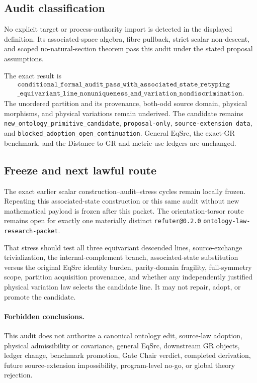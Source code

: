 \subsection{Audit classification}

No explicit target or process-authority import is detected in the displayed
definition.  Its associated-space algebra, fibre pullback, strict scalar
non-descent, and scoped no-natural-section theorem pass this audit under the
stated proposal assumptions.

The exact result is
\[
\begin{split}
\texttt{conditional\_formal\_audit\_pass\_with\_associated\_state\_retyping}\\
\texttt{\_equivariant\_line\_nonuniqueness\_and\_variation\_nondiscrimination}.
\end{split}
\]
The unordered partition and its provenance, both-odd source domain, physical
morphisms, and physical variations remain underived.  The candidate remains
\texttt{new\_ontology\_primitive\_candidate}, \texttt{proposal-only},
\texttt{source-extension data}, and
\texttt{blocked\_adoption\_open\_continuation}.  General
\(\mathrm{EqSrc}\), the exact-GR benchmark, and the Distance-to-GR and
metric-use ledgers are unchanged.

\subsection{Freeze and next lawful route}

The exact earlier scalar construction--audit--stress cycles remain locally
frozen.  Repeating this associated-state construction or this same audit
without new mathematical payload is frozen after this packet.  The
orientation-torsor route remains open for exactly one materially distinct
\texttt{refuter@0.2.0} \texttt{ontology-law-research-packet}.

That stress should test all three equivariant descended lines,
source-exchange trivialization, the internal-complement branch,
associated-state substitution versus the original EqSrc identity burden,
parity-domain fragility, full-symmetry scope, partition acquisition
provenance, and whether any independently justified physical variation law
selects the candidate line.  It may not repair, adopt, or promote the
candidate.

\paragraph{Forbidden conclusions.}
This audit does not authorize a canonical ontology edit, source-law adoption,
physical admissibility or covariance, general EqSrc, downstream GR objects,
ledger change, benchmark promotion, Gate Chair verdict, completed derivation,
future source-extension impossibility, program-level no-go, or global theory
rejection.
